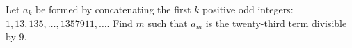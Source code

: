 Let $a_k$ be formed by concatenating the first $k$ positive odd integers: $1,13,135,\ldots,1357911,\ldots$. Find $m$ such that $a_m$ is the twenty-third term divisible by $9$.
